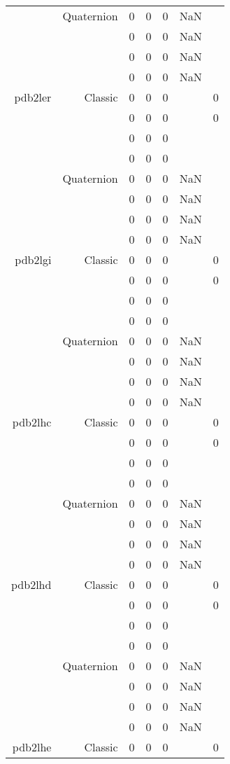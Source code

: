 \begin{xltabular}{\textwidth}{r|rcccSc}
& Quaternion & 0 & 0 & 0 & NaN & \\
& & 0 & 0 & 0 & NaN & \\
& & 0 & 0 & 0 & NaN & \\
& & 0 & 0 & 0 & NaN & \\ \addlinespace
pdb2ler & Classic & 0 & 0 & 0 & & 0 \\
& & 0 & 0 & 0 & & 0 \\
& & 0 & 0 & 0 & & \\
& & 0 & 0 & 0 & & \\
& Quaternion & 0 & 0 & 0 & NaN & \\
& & 0 & 0 & 0 & NaN & \\
& & 0 & 0 & 0 & NaN & \\
& & 0 & 0 & 0 & NaN & \\ \addlinespace
pdb2lgi & Classic & 0 & 0 & 0 & & 0 \\
& & 0 & 0 & 0 & & 0 \\
& & 0 & 0 & 0 & & \\
& & 0 & 0 & 0 & & \\
& Quaternion & 0 & 0 & 0 & NaN & \\
& & 0 & 0 & 0 & NaN & \\
& & 0 & 0 & 0 & NaN & \\
& & 0 & 0 & 0 & NaN & \\ \addlinespace
pdb2lhc & Classic & 0 & 0 & 0 & & 0 \\
& & 0 & 0 & 0 & & 0 \\
& & 0 & 0 & 0 & & \\
& & 0 & 0 & 0 & & \\
& Quaternion & 0 & 0 & 0 & NaN & \\
& & 0 & 0 & 0 & NaN & \\
& & 0 & 0 & 0 & NaN & \\
& & 0 & 0 & 0 & NaN & \\ \addlinespace
pdb2lhd & Classic & 0 & 0 & 0 & & 0 \\
& & 0 & 0 & 0 & & 0 \\
& & 0 & 0 & 0 & & \\
& & 0 & 0 & 0 & & \\
& Quaternion & 0 & 0 & 0 & NaN & \\
& & 0 & 0 & 0 & NaN & \\
& & 0 & 0 & 0 & NaN & \\
& & 0 & 0 & 0 & NaN & \\ \addlinespace
pdb2lhe & Classic & 0 & 0 & 0 & & 0 \\

\end{xltabular}
